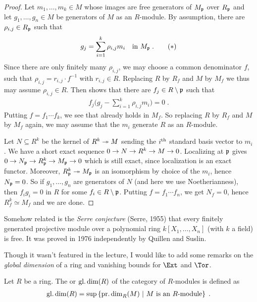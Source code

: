 \documentclass[a4paper,parskip=half,numbers=enddot, DIV=12]{scrreprt}
\begin{document}
\begin{proof}
	Let $m_1,\ldots,m_k\in M$ whose images are free generators of $M_{\mathfrak{p}}$ over $R_{\mathfrak{p}}$ and let $g_1,\ldots,g_n\in M$ be generators of $M$ as an $R$-module. By assumption, there are $\rho_{i,j}\in R_{\mathfrak{p}}$ such that
	\begin{align}\lbl{eq:gjInR_p}
		g_j=\sum_{i=1}^k\rho_{i,j}m_i\quad\text{in }M_\pp\;.\tag{$*$}
	\end{align}
	Since there are only finitely many $\rho_{i,j}$, we may choose a common denominator $f$, such that $\rho_{i,j}=r_{i,j}\cdot f^{-1}$ with $r_{i,j}\in R$. Replacing $R$ by $R_f$ and $M$ by $M_f$ we thus may assume $\rho_{i,j}\in R$. Then  shows that there are $f_j\in R\setminus \mathfrak{p}$ such that
	\begin{align*}
		f_j\bigg(g_j-\sum_{i=1}^k\rho_{i,j}m_i\bigg)=0\;.
	\end{align*}
	Putting $f=f_1\cdots f_k$, we see that  already holds in $M_f$. So replacing $R$ by $R_f$ and $M$ by $M_f$ again, we may assume that the $m_i$ generate $R$ as an $R$-module.
	
	Let $N\subseteq R^k$ be the kernel of $R^k\epimorphism M$ sending the $i^{\text{th}}$ standard basis vector to $m_i$. We have a short exact sequence $0\morphism N\morphism R^k\morphism M\morphism 0$. Localizing at $\mathfrak{p}$ gives $0\morphism N_\pp\morphism R_\pp^k\morphism M_\pp\morphism 0$ which is still exact, since localization is an exact functor. Moreover, $R_\pp^k\epimorphism M_\pp$ is an isomorphism by choice of the $m_i$, hence $N_{\mathfrak{p}}=0$. So if $g_1,\ldots,g_n$ are generators of $N$ (and here we use Noetherianness), then $f_ig_i=0$ in $R$ for some $f_i\in R\setminus \mathfrak{p}$. Putting $f=f_1\cdots f_n$, we get $N_f=0$, hence $R_f^k\simeq M_f$ and we are done.
\end{proof}
\begin{rem*}
	Somehow related is the \emph{Serre conjecture} (Serre, 1955) that every finitely generated projective module over a polynomial ring $k[X_1,\ldots,X_n]$ (with $k$ a field) is free. It was proved in 1976 independently by Quillen and Suslin.
\end{rem*}
Though it wasn't featured in the lecture, I would like to add some remarks on the \emph{global dimension} of a ring and vanishing bounds for $\Ext$ and $\Tor$.
\begin{defi}
	Let $R$ be a ring. The  or  $\operatorname{gl.dim}(R)$ of the category of $R$-modules is defined as
	\begin{align*}
	\operatorname{gl.dim}(R)=\sup\left\{\operatorname{pr.dim}_R(M)\ \middle|\  M\text{ is an }R\text{-module}\right\}\;.
	\end{align*}
\end{defi}
\end{document}
